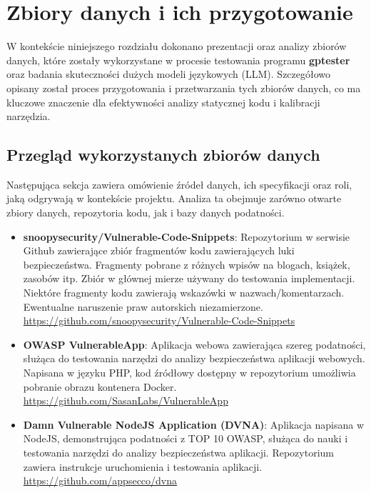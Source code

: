 \chapter{Zbiory danych i ich przygotowanie}
\label{ch:zbiory_danych}

W kontekście niniejszego rozdziału dokonano prezentacji oraz analizy zbiorów danych, które zostały wykorzystane w procesie testowania programu \textbf{gptester} oraz badania skuteczności dużych modeli językowych (LLM). Szczegółowo opisany został proces przygotowania i przetwarzania tych zbiorów danych, co ma kluczowe znaczenie dla efektywności analizy statycznej kodu i kalibracji narzędzia.


\section{Przegląd wykorzystanych zbiorów danych}
\label{sec:przeglad_zbiorow}

Następująca sekcja zawiera omówienie źródeł danych, ich specyfikacji oraz roli, jaką odgrywają w kontekście projektu. Analiza ta obejmuje zarówno otwarte zbiory danych, repozytoria kodu, jak i bazy danych podatności.


\begin{itemize}
    \item \textbf{snoopysecurity/Vulnerable-Code-Snippets}: Repozytorium w serwisie Github zawierające zbiór fragmentów kodu zawierających luki bezpieczeństwa. Fragmenty pobrane z różnych wpisów na blogach, książek, zasobów itp. 
    Zbiór w głównej mierze używany do testowania implementacji. Niektóre fragmenty kodu zawierają wskazówki w nazwach/komentarzach. Ewentualne naruszenie praw autorskich niezamierzone.\\ \url{https://github.com/snoopysecurity/Vulnerable-Code-Snippets}


    \item \textbf{OWASP VulnerableApp}: Aplikacja webowa zawierająca szereg podatności, służąca do testowania narzędzi do analizy bezpieczeństwa aplikacji webowych. Napisana w języku PHP, kod źródłowy dostępny w repozytorium umożliwia pobranie obrazu kontenera Docker. \url{https://github.com/SasanLabs/VulnerableApp}

    \item \textbf{Damn Vulnerable NodeJS Application (DVNA)}: Aplikacja napisana w NodeJS, demonstrująca podatności z TOP 10 OWASP, służąca do nauki i testowania narzędzi do analizy bezpieczeństwa aplikacji. Repozytorium zawiera instrukcje uruchomienia i testowania aplikacji. \url{https://github.com/appsecco/dvna}
\end{itemize}

